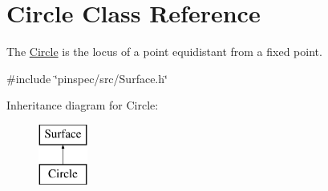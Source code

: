 \hypertarget{classCircle}{\section{Circle Class Reference}
\label{classCircle}
}


The \hyperlink{classCircle}{Circle} is the locus of a point equidistant from a fixed point.  




{\ttfamily \#include \char`\"{}pinspec/src/\-Surface.\-h\char`\"{}}

Inheritance diagram for Circle\-:\begin{figure}[H]
\begin{center}
\leavevmode
\includegraphics[height=2.000000cm]{classCircle}
\end{center}
\end{figure}
